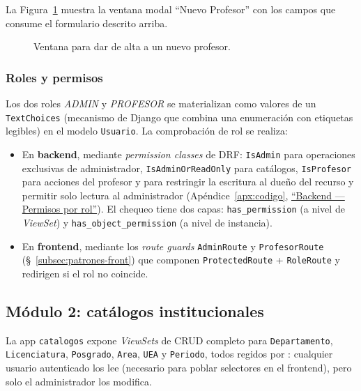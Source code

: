 La Figura~\ref{fig:admin_crear_profesor} muestra la ventana modal ``Nuevo Profesor'' con los campos que consume el formulario descrito arriba.

\begin{figure}[!htbp]
    \centering
    \caption{Ventana para dar de alta a un nuevo profesor.}
    \label{fig:admin_crear_profesor}
\end{figure}

\subsubsection{Roles y permisos}

Los dos roles \emph{ADMIN} y \emph{PROFESOR} se materializan como valores de un \texttt{TextChoices} (mecanismo de Django que combina una enumeración con etiquetas legibles) en el modelo \texttt{Usuario}. La comprobación de rol se realiza:

\begin{itemize}
    \item En \textbf{backend}, mediante \emph{permission classes} de DRF: \texttt{IsAdmin} para operaciones exclusivas de administrador, \texttt{IsAdminOrReadOnly} para catálogos, \texttt{IsProfesor} para acciones del profesor y  para restringir la escritura al dueño del recurso y permitir solo lectura al administrador (Apéndice~\ref{apx:codigo}, \hyperref[lst:permissions]{``Backend --- Permisos por rol''}). El chequeo tiene dos capas: \texttt{has\_permission} (a nivel de \emph{ViewSet}) y \texttt{has\_object\_permission} (a nivel de instancia).
    \item En \textbf{frontend}, mediante los \emph{route guards} \texttt{AdminRoute} y \texttt{ProfesorRoute} (\S~\ref{subsec:patrones-front}) que componen \texttt{ProtectedRoute} + \texttt{RoleRoute} y redirigen si el rol no coincide.
\end{itemize}

\subsection{Módulo 2: catálogos institucionales}

La app \texttt{catalogos} expone \emph{ViewSets} de CRUD completo para \texttt{Departamento}, \texttt{Licenciatura}, \texttt{Posgrado}, \texttt{Area}, \texttt{UEA} y \texttt{Periodo}, todos regidos por : cualquier usuario autenticado los lee (necesario para poblar selectores en el frontend), pero solo el administrador los modifica.

